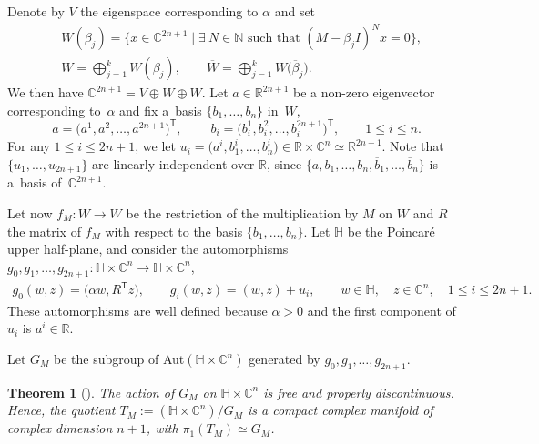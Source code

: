 \documentclass[pdftex]{sigma}
\newcommand{\C}{{\mathbb C}}
\newcommand{\R}{{\mathbb R}}
\newcommand{\6}{\partial}
\numberwithin{equation}{section}
\newtheorem{Theorem}{Theorem}[section]
\begin{document}
Denote by $V$ the eigenspace corresponding to $\alpha$ and set
\begin{equation*}
	\begin{split}
		&W(\beta_j)=\bigl\{x \in \mathbb{C}^{2n+1}\mid \exists \ N \in \mathbb{N} \text{ such that } (M-\beta_j I)^Nx=0\bigr\},\\
	 &W=\bigoplus \limits_{j=1}^{k} W(\beta_j),\qquad \overline{W}=\bigoplus\limits_{j=1}^{k} W\big(\overline{\beta}_j\big).
	\end{split}
\end{equation*}
We then have $\mathbb{C}^{2n+1}=V \oplus W \oplus \overline{W}$.
Let $a \in \R^{2n+1}$ be a non-zero eigenvector corresponding to~$\alpha$ and fix a~basis $\{b_1, \dots, b_n\}$ in~$W$,
\[
a=\big(a^1, a^2, \dots, a^{2n+1}\big)^{\mathsf{T}},\qquad \ b_i=\big( b_{i}^1, b_{i}^2, \dots, b_{i}^{2n+1}\big)^{\mathsf{T}}, \qquad 1 \leq i\leq n.
\]
For any $1 \le i \le 2n + 1$, we let $u_i = \big(a^i, b_1^i, \dots , b_n^i\big) \in \R \times \C^n \simeq \R^{2n+1}$.
Note that $\{u_1, \dots , u_{2n+1} \}$ are linearly independent over $\R$, since $\bigl\{a, b_1, \dots, b_n, \overline{b}_1, \dots, \overline{b}_n\bigr\}$ is a~basis of~$\mathbb{C}^{2n+1}$.

Let now $f_M\colon W \longrightarrow W$ be the restriction of the multiplication by $M$ on $W$ and $R$ the matrix of $f_M$ with respect to the basis $\{b_1, \dots , b_n\}$. Let $\mathbb{H}$ be the Poincar\'e upper half-plane, and consider the automorphisms $g_0, g_1, \dots, g_{2n+1}\colon \mathbb{H} \times \mathbb{C}^n \longrightarrow \mathbb{H} \times \mathbb{C}^n$,
\begin{gather*}
 g_0(w,z)=\big(\alpha w, R^{\mathsf{T}}z\big), \qquad g_i(w,z)=(w,z)+u_i,\qquad w \in \mathbb{H}, \quad z \in \mathbb{C}^n,\quad 1 \leq i \leq 2n+1.
\end{gather*}
These automorphisms are well defined because $\alpha > 0$ and the first component of $u_i$ is $a^i \in \R$.

Let $G_M$ be the subgroup of Aut$(\mathbb{H} \times \mathbb{C}^n)$ generated by $g_0, g_1, \dots, g_{2n+1}$.

\begin{Theorem}[{\cite{pajitnov1}}] The action of $G_M$ on $\mathbb{H} \times \mathbb{C}^n$ is free and properly discontinuous. Hence, the quotient $T_M:= (\mathbb{H} \times \mathbb{C}^n)/G_M$ is a compact complex manifold of complex dimension $n+1$, with $\pi_1(T_M) \simeq G_M$.
\end{Theorem}
\end{document}

